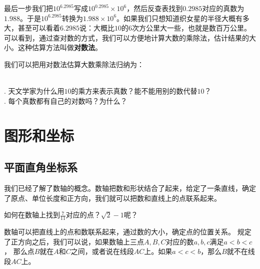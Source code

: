 \documentclass[12pt,UTF8]{ctexbook}
\begin{document}
最后一步我们把$10^{6.2985}$写成$10^{0.2985}\times 10^{6}$，然后反查表找到$0.2985$对应的真数为$1.988$。于是$10^{6.2985}$转换为$1.988\times 10^6$。如果我们只想知道织女星的半径大概有多大，甚至可以看着$6.2985$说：大概比$10$的$6$次方公里大一些，也就是数百万公里。可以看到，通过查对数的方式，我们可以方便地计算大数的乘除法，估计结果的大小。这种估算方法叫做\textbf{对数法}。

我们可以把用对数法估算大数乘除法归纳为：
\begin{center}
\end{center}

\clearpage

\begin{sk}
    \mbox{}\\
    . 天文学家为什么用$10$的乘方来表示真数？能不能用别的数代替$10$？\\
    . 每个真数都有自己的对数吗？为什么？
\end{sk}

\chapter{图形和坐标}
\section{平面直角坐标系}
我们已经了解了数轴的概念。数轴把数和形状结合了起来，给定了一条直线，确定了原点、单位长度和正方向，我们就可以把数和直线上的点联系起来。

\begin{sk}\label{sk:4-0-0}
    如何在数轴上找到$\frac{7}{11}$对应的点？$\sqrt{2} - 1$呢？
\end{sk}

数轴可以把直线上的点和数联系起来，通过数的大小，确定点的位置关系。
规定了正方向之后，我们可以说，如果数轴上三点$A,B,C$对应的数$a,b,c$满足$a < b < c$，
那么点$B$就在$A$和$C$之间，或者说在线段$AC$上。如果$a < c < b$，那么$B$就不在线段$AC$上。
\end{document}
